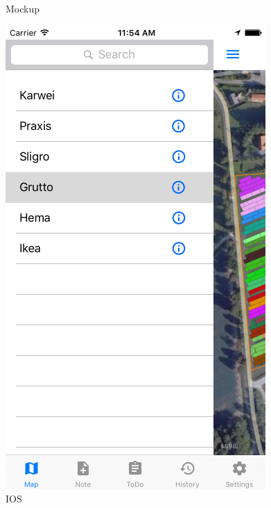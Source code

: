 \documentclass[12pt]{article}
\begin{document}
\begin{figure}[ht]
	\caption{Mockup}
	\endminipage\hfill
	\centering
	\includegraphics[width=\linewidth, height=0.4\textheight, keepaspectratio=true, frame]{screenshots/MenuIos.png}
	\caption{IOS}
	\endminipage\hfill
	\centering

\end{figure}
\end{document}
